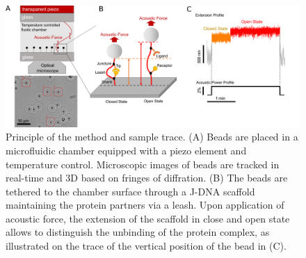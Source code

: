 \documentclass{biophys-new}
\begin{document}
\begin{figure}[hbt!]
	\centering
	\includegraphics[width=1\linewidth]{Figures/fig1.png}
	\caption{Principle of the method and sample trace. (A) Beads are placed in a microfluidic chamber equipped with a piezo element and temperature control. Microscopic images of beads are tracked in real-time and 3D based on fringes of diffration. (B) The beads are tethered to the chamber surface through a J-DNA scaffold maintaining the protein partners via a leash. Upon application of acoustic force, the extension of the scaffold in close and open state allows to distinguish the unbinding of the protein complex, as illustrated on the trace of the vertical position of the bead in (C).}
	\label{fig:principle}
\end{figure}


 
\end{document}
